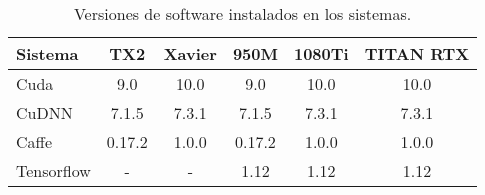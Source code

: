 \begin{table}[]
\centering
\caption{Versiones de software instalados en los sistemas. }


\begin{tabular}{lccccc}
\toprule
Sistema    & TX2    & Xavier & 950M   & 1080Ti & TITAN RTX \\
\midrule
Cuda       & 9.0    & 10.0   & 9.0    & 10.0   & 10.0      \\
CuDNN      & 7.1.5  & 7.3.1  & 7.1.5  & 7.3.1  & 7.3.1     \\
Caffe      & 0.17.2 & 1.0.0  & 0.17.2 & 1.0.0  & 1.0.0     \\
Tensorflow & -      & -      & 1.12   & 1.12   & 1.12     \\
\bottomrule
\end{tabular}



\label{tab-software}
\end{table}


